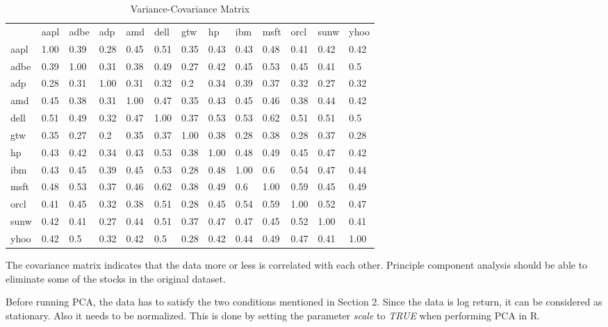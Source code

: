 \documentclass[conference]{IEEEtran}
\begin{document}
\begin{table}[!h]
\centering
\caption{Variance-Covariance Matrix}
\label{VarMatrix}
\resizebox{9cm}{!} {
\begin{tabular}{lllllllllllll}
 & aapl & adbe & adp  & amd  & dell & gtw  & hp   & ibm  & msft & orcl & sunw & yhoo      \\
aapl & 1.00    & 0.39 & 0.28 & 0.45 & 0.51 & 0.35 & 0.43 & 0.43 & 0.48 & 0.41 & 0.42 & 0.42 \\
adbe & 0.39 & 1.00    & 0.31 & 0.38 & 0.49 & 0.27 & 0.42 & 0.45 & 0.53 & 0.45 & 0.41 & 0.5  \\
adp  & 0.28 & 0.31 & 1.00    & 0.31 & 0.32 & 0.2  & 0.34 & 0.39 & 0.37 & 0.32 & 0.27 & 0.32 \\
amd  & 0.45 & 0.38 & 0.31 & 1.00    & 0.47 & 0.35 & 0.43 & 0.45 & 0.46 & 0.38 & 0.44 & 0.42 \\
dell & 0.51 & 0.49 & 0.32 & 0.47 & 1.00    & 0.37 & 0.53 & 0.53 & 0.62 & 0.51 & 0.51 & 0.5  \\
gtw  & 0.35 & 0.27 & 0.2  & 0.35 & 0.37 & 1.00    & 0.38 & 0.28 & 0.38 & 0.28 & 0.37 & 0.28 \\
hp   & 0.43 & 0.42 & 0.34 & 0.43 & 0.53 & 0.38 & 1.00    & 0.48 & 0.49 & 0.45 & 0.47 & 0.42 \\
ibm  & 0.43 & 0.45 & 0.39 & 0.45 & 0.53 & 0.28 & 0.48 & 1.00    & 0.6  & 0.54 & 0.47 & 0.44 \\
msft & 0.48 & 0.53 & 0.37 & 0.46 & 0.62 & 0.38 & 0.49 & 0.6  & 1.00    & 0.59 & 0.45 & 0.49 \\
orcl & 0.41 & 0.45 & 0.32 & 0.38 & 0.51 & 0.28 & 0.45 & 0.54 & 0.59 & 1.00    & 0.52 & 0.47 \\
sunw & 0.42 & 0.41 & 0.27 & 0.44 & 0.51 & 0.37 & 0.47 & 0.47 & 0.45 & 0.52 & 1.00    & 0.41 \\
yhoo & 0.42 & 0.5  & 0.32 & 0.42 & 0.5  & 0.28 & 0.42 & 0.44 & 0.49 & 0.47 & 0.41 & 1.00   
\end{tabular}
}
\end{table}

The covariance matrix indicates that the data more or less is correlated with each other. Principle component analysis should be able to eliminate some of the stocks in the original dataset. 

Before running PCA, the data has to satisfy the two conditions mentioned in Section 2. Since the data is log return, it can be considered as stationary. Also it needs to be normalized. This is done by setting the parameter \emph{scale} to \emph{TRUE} when performing PCA in R. 
\end{document}
